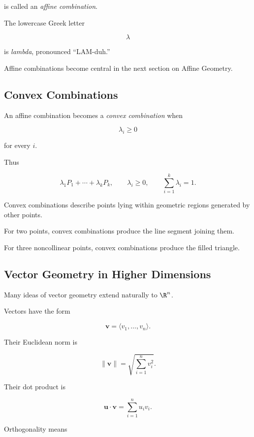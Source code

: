 is called an \emph{affine combination}.

The lowercase Greek letter

\[ \lambda \]

is \emph{lambda}, pronounced ``LAM-duh.''

Affine combinations become central in the next section on Affine Geometry.

\subsection{Convex Combinations}
\label{subsec:vector-convex-combinations}

An affine combination becomes a \emph{convex combination} when

\[ \lambda_i\geq0 \]

for every \(i\).

Thus

\[
\boxed{
\lambda_1P_1+\cdots+\lambda_kP_k,
\qquad
\lambda_i\geq0,
\qquad
\sum_{i=1}^{k}\lambda_i=1.
}
\]

Convex combinations describe points lying within geometric regions generated
by other points.

For two points, convex combinations produce the line segment joining them.

For three noncollinear points, convex combinations produce the filled
triangle.

\subsection{Vector Geometry in Higher Dimensions}
\label{subsec:vector-geometry-higher-dimensions}

Many ideas of vector geometry extend naturally to \(\R^n\).

Vectors have the form

\[ \mathbf{v}=\langle v_1,\ldots,v_n\rangle. \]

Their Euclidean norm is

\[ \|\mathbf{v}\|=\sqrt{\sum_{i=1}^{n}v_i^2}. \]

Their dot product is

\[ \mathbf{u}\cdot\mathbf{v}=\sum_{i=1}^{n}u_iv_i. \]

Orthogonality means

